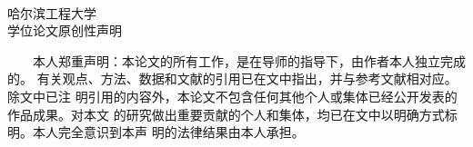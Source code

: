 {\begin{titlepage}
\begin{center}
    \parbox[t][3.0cm][b]{\textwidth}{\erhao
    \begin{center} {  \@etitle}\end{center} }

    \parbox[t][4.0cm][t]{\textwidth}{
    \begin{center}  \end{center} }

    \parbox[t][6cm][c]{\textwidth}{ {\sihao
    \begin{center} \renewcommand{\arraystretch}{1.5}
    	\parbox[t][1.0cm][t]{\textwidth}{
    		\sihao
    		\makebox[3.6cm][c]{}
    		\makebox[7em][l]{\song \@eauthor}
    	}
    	\parbox[t][1.0cm][t]{\textwidth}{
    		\sihao
    		\makebox[3.6cm][c]{}
    		\makebox[7em][l]{\song \@esupervisor}
    	}
    	\parbox[t][1.0cm][t]{\textwidth}{
    		\sihao
    		\makebox[3.6cm][c]{}
    		\makebox[7em][l]{\song \@edegree}
    	}
    	\parbox[t][1.0cm][t]{\textwidth}{
    		\sihao
    		\makebox[3.6cm][c]{}
    		\makebox[7em][l]{\song \@esubject}
    	}
    	\parbox[t][1.0cm][t]{\textwidth}{
    		\sihao
    		\makebox[3.6cm][c]{}
    		\makebox[7em][l]{\song \@edate}
    	}
    	\parbox[t][1.0cm][t]{\textwidth}{
    		\sihao
    		\makebox[3.6cm][c]{}
    		\makebox[7em][l]{\song \@edate}
    	}
    	\parbox[t][1.0cm][t]{\textwidth}{
    		\sihao
    		\makebox[3.6cm][c]{}
    	}
    \end{center}}}

    \end{center}
    
    \ifoneortwoside
    \newpage
    ~~~\vspace{1em}
    \thispagestyle{empty}
    \fi
    \newpage
    \thispagestyle{empty}
    \begin{center}
    	\heiti  \xiaosan 哈尔滨工程大学\\学位论文原创性声明
    \end{center}
    
    ~~~~本人郑重声明：本论文的所有工作，是在导师的指导下，由作者本人独立完成的。
    有关观点、方法、数据和文献的引用已在文中指出，并与参考文献相对应。除文中已注
    明引用的内容外，本论文不包含任何其他个人或集体已经公开发表的作品成果。对本文
    的研究做出重要贡献的个人和集体，均已在文中以明确方式标明。本人完全意识到本声
    明的法律结果由本人承担。\\
    

\end{titlepage}}
